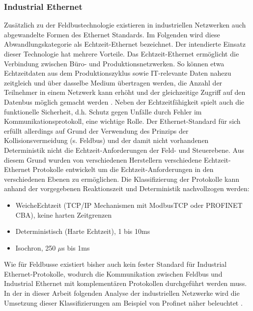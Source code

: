 \subsubsection{Industrial Ethernet}
Zusätzlich zu der Feldbustechnologie existieren in industriellen Netzwerken auch abgewandelte Formen des Ethernet Standards. Im Folgenden wird diese Abwandlungskategorie als \glqq Echtzeit-Ethernet\grqq{} bezeichnet. Der intendierte Einsatz dieser Technologie hat mehrere Vorteile. Das Echtzeit-Ethernet ermöglicht die Verbindung zwischen Büro- und Produktionsnetzwerken. So können etwa Echtzeitdaten aus dem Produktionszyklus sowie IT-relevante Daten nahezu zeitgleich und über dasselbe Medium übertragen werden, die Anzahl der Teilnehmer in einem Netzwerk kann erhöht und der gleichzeitige Zugriff auf den Datenbus möglich gemacht werden \citep{IndEth1}. %
Neben der Echtzeitfähigkeit spielt auch die funktionelle Sicherheit, d.h. Schutz gegen Unfälle durch Fehler im Kommunikationsprotokoll, eine wichtige Rolle\citep{Pereira2009}. %
Der Ethernet-Standard für sich erfüllt allerdings auf Grund der Verwendung des Prinzips der Kollisionsvermeidung (s. Feldbus) und der damit nicht vorhandenen Deterministik nicht die Echtzeit-Anforderungen der Feld- und Steuerebene.
Aus diesem Grund wurden von verschiedenen Herstellern verschiedene Echtzeit-Ethernet Protokolle entwickelt um die Echtzeit-Anforderungen in den verschiedenen Ebenen zu ermöglichen. 
Die Klassifizierung der Protokolle kann anhand der vorgegebenen Reaktionszeit und Deterministik nachvollzogen werden\citep{Pereira2009}:
\begin{itemize}
\item \glqq Weiche\grqq  Echtzeit (TCP/IP Mechanismen mit ModbusTCP oder PROFINET CBA), keine harten Zeitgrenzen
\item Deterministisch (Harte Echtzeit), 1 bis 10ms
\item Isochron, 250 $\mu $s bis 1ms
\end{itemize}


Wie für Feldbusse existiert bisher auch kein fester Standard für Industrial Ethernet-Protokolle, wodurch die Kommunikation zwischen Feldbus und Industrial Ethernet mit komplementären Protokollen durchgeführt werden muss. In der in dieser Arbeit folgenden Analyse der industriellen Netzwerke wird die Umsetzung dieser Klassifizierungen am Beispiel von Profinet näher beleuchtet \citep{IndEth3}. %

